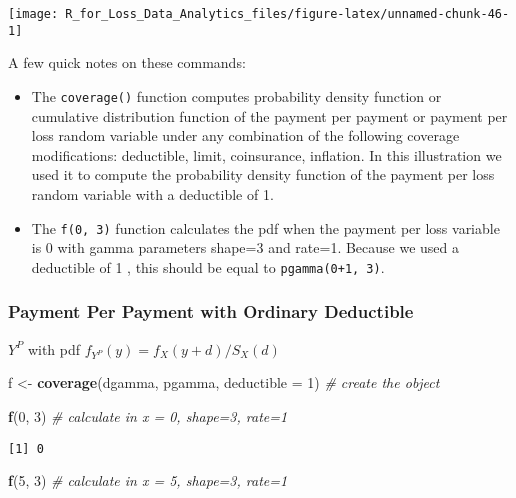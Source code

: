 \documentclass[]{book}
\newenvironment{Shaded}{\begin{snugshade}}{\end{snugshade}}
\newcommand{\KeywordTok}[1]{\textcolor[rgb]{0.13,0.29,0.53}{\textbf{#1}}}
\newcommand{\DataTypeTok}[1]{\textcolor[rgb]{0.13,0.29,0.53}{#1}}
\newcommand{\DecValTok}[1]{\textcolor[rgb]{0.00,0.00,0.81}{#1}}
\newcommand{\StringTok}[1]{\textcolor[rgb]{0.31,0.60,0.02}{#1}}
\newcommand{\CommentTok}[1]{\textcolor[rgb]{0.56,0.35,0.01}{\textit{#1}}}
\newcommand{\NormalTok}[1]{#1}
\providecommand{\tightlist}{%
  \setlength{\itemsep}{0pt}\setlength{\parskip}{0pt}}
\theoremstyle{definition}
\theoremstyle{definition}
\theoremstyle{definition}
\theoremstyle{remark}
\begin{document}
\begin{center}\texttt{[image: R\_for\_Loss\_Data\_Analytics\_files/figure-latex/unnamed-chunk-46-1]} \end{center}

A few quick notes on these commands:

\begin{itemize}
\tightlist
\item
  The \texttt{coverage()} function computes probability density function
  or cumulative distribution function of the payment per payment or
  payment per loss random variable under any combination of the
  following coverage modifications: deductible, limit, coinsurance,
  inflation. In this illustration we used it to compute the probability
  density function of the payment per loss random variable with a
  deductible of 1.
\item
  The \texttt{f(0,\ 3)} function calculates the pdf when the payment per
  loss variable is 0 with gamma parameters shape=3 and rate=1. Because
  we used a deductible of 1 , this should be equal to
  \texttt{pgamma(0+1,\ 3)}.
\end{itemize}

\subsubsection{Payment Per Payment with Ordinary
Deductible}\label{payment-per-payment-with-ordinary-deductible}

\(Y^P\) with pdf \(f_{Y^P}(y) = f_X(y+d)/S_X(d)\)

\begin{Shaded}
\begin{Highlighting}[]
\NormalTok{f <-}\StringTok{ }\KeywordTok{coverage}\NormalTok{(dgamma, pgamma, }\DataTypeTok{deductible =} \DecValTok{1}\NormalTok{) }\CommentTok{# create the object}

\KeywordTok{f}\NormalTok{(}\DecValTok{0}\NormalTok{, }\DecValTok{3}\NormalTok{) }\CommentTok{# calculate in x = 0, shape=3, rate=1}
\end{Highlighting}
\end{Shaded}

\begin{verbatim}
[1] 0
\end{verbatim}

\begin{Shaded}
\begin{Highlighting}[]
\KeywordTok{f}\NormalTok{(}\DecValTok{5}\NormalTok{, }\DecValTok{3}\NormalTok{) }\CommentTok{# calculate in x = 5, shape=3, rate=1}
\end{Highlighting}
\end{Shaded}
\end{document}
